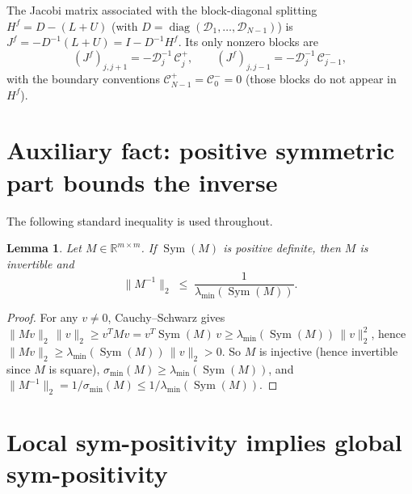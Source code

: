 \documentclass{article}
\newtheorem{lemma}{Lemma}
\newcommand{\RR}{\mathbb{R}}
\newcommand{\Sym}{\operatorname{Sym}}
\begin{document}
The Jacobi matrix associated with the block-diagonal splitting $H^f = D - (L + U)$
(with $D = \operatorname{diag}(\mathcal{D}_1, \ldots, \mathcal{D}_{N-1})$) is
$J^f = -D^{-1}(L+U) = I - D^{-1} H^f$. Its only nonzero blocks are
\[
    (J^f)_{j, j+1} = -\mathcal{D}_j^{-1}\, \mathcal{C}^+_j, \qquad
    (J^f)_{j, j-1} = -\mathcal{D}_j^{-1}\, \mathcal{C}^-_{j-1},
\]
with the boundary conventions $\mathcal{C}^+_{N-1}\!=\!\mathcal{C}^-_0\!=\!0$
(those blocks do not appear in $H^f$).

\section{Auxiliary fact: positive symmetric part bounds the inverse}

The following standard inequality is used throughout.

\begin{lemma}\label{lem:sym-bound-inverse}
    Let $M \in \RR^{m\times m}$. If $\Sym(M)$ is positive definite, then $M$ is
    invertible and
    \[
        \|M^{-1}\|_2 \;\leq\; \frac{1}{\lambda_{\min}(\Sym(M))}.
    \]
\end{lemma}
\begin{proof}
    For any $v \neq 0$, Cauchy--Schwarz gives
    $\|Mv\|_2\,\|v\|_2 \geq v^T M v = v^T \Sym(M)\, v \geq \lambda_{\min}(\Sym(M))\,\|v\|_2^2$,
    hence $\|Mv\|_2 \geq \lambda_{\min}(\Sym(M))\,\|v\|_2 > 0$. So $M$ is injective
    (hence invertible since $M$ is square), $\sigma_{\min}(M) \geq \lambda_{\min}(\Sym(M))$,
    and $\|M^{-1}\|_2 = 1/\sigma_{\min}(M) \leq 1/\lambda_{\min}(\Sym(M))$.
\end{proof}

\section{Local sym-positivity implies global sym-positivity}
\end{document}
